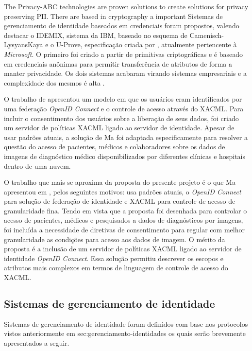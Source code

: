 \documentclass{doublecol-new}
\begin{document}
The Privacy-ABC technologies are proven solutions to create solutions for privacy preserving PII. There are based in cryptography a important 
Sistemas de gerenciamento de identidade baseados em credenciais foram propostos, valendo destacar o IDEMIX\cite{camenisch2002design}, sistema da IBM, baseado no esquema de Camenisch-LysyansKaya \cite{camenisch2001efficient} e o U-Prove, especificação criada por \cite{brands2000rethinking}, atualmente pertencente à \textit{Microsoft}. O primeiro foi criado a partir de primitivas criptográficas e é baseado em credenciais anônimas para permitir transferência de atributos de forma a manter privacidade. Os dois sistemas acabaram virando sistemas empresariais e a complexidade dos mesmos é alta \cite{nogueira2014aprimoramento}.

O trabalho de \cite{ma2015cloud} apresentou um modelo em que os usuários eram identificados por uma federação \textit{OpenID Connect} e o controle de acesso através do XACML. Para incluir o consentimento dos usuários sobre a liberação de seus dados, foi criado um servidor de políticas XACML ligado ao servidor de identidade. Apesar de usar padrões atuais, a solução de Ma foi adaptada especificamente para resolver a questão do acesso de pacientes, médicos e colaboradores sobre os dados de imagens de diagnóstico médico disponibilizados por diferentes clínicas e hospitais dentro de uma nuvem.

O trabalho que mais se aproxima da proposta do presente projeto é o que Ma apresentou em \cite{ma2015cloud}, pelos seguintes motivos: usa padrões atuais, o \textit{OpenID Connect} para solução de federação de identidade e XACML para controle de acesso de granularidade fina. Tendo em vista que a proposta foi desenhada para controlar o acesso de pacientes, médicos e pesquisados a dados de diagnósticos por imagens, foi incluída a necessidade de diretivas de consentimento para regular com melhor granularidade as condições para acesso aos dados de imagem. O mérito da proposta é a inclusão de um servidor de políticas XACML ligado ao servidor de identidade \textit{OpenID Connect}. Essa solução permitiu descrever os escopos e atributos mais complexos em termos de linguagem de controle de acesso do XACML.


\subsection{Sistemas de gerenciamento de identidade}

Sistemas de gerenciamento de identidade foram definidos com base nos protocolos vistos anteriormente em sec:gerenciamento-identidades os quais serão brevemente apresentados a seguir. 
\end{document}
